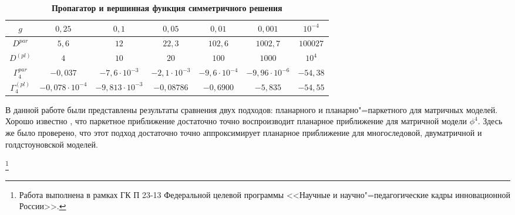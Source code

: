 \begin{table}[h!]
\centering \small
\setlength{\tabcolsep}{4.2pt}
\caption{\bf Пропагатор и вершинная функция симметричного решения \label{sisk:3}} \vspace{-3mm}
\begin{tabular}{c|cccccc}
\hline \scriptsize $g$ & \scriptsize $0,25$ & \scriptsize $0,1$ & \scriptsize$0,05$ & \scriptsize$0,01$ & \scriptsize$0,001$ & $10^{-4}$
\\
\hline 
\rule{0mm}{12pt}%
\scriptsize $D^{par}$ & $5,6$ & $12$ & $22,3$ & $102,6$ & $1002,7$ & $100027$ \\
\scriptsize $D^{(pl)}$ & $4$ & $10$ & $20$ & $100$ & $1000$ & $10^{4}$
\\
\hline 
\rule{0mm}{12pt}%
\scriptsize $\Gamma _4^{par}$ & $-0,037 $ & $-7,6 \cdot 10^{-3}$ & $-2,1\cdot 10^{-3}$ & $-9,6\cdot 10^{-4}$ & $-9,96\cdot 10^{-6}$ & $-54,38$
\\
\scriptsize $\Gamma _4^{(pl)}$ & $-0,078 \cdot 10^{-4}$ & $-9,813 \cdot 10^{-3}$ & $-0,08786$ & $-0,6900$ & $-5,835$ & $-54,55$
\\
\hline
\end{tabular}
\end{table}

 В данной работе были представлены результаты сравнения двух подходов: планарного и планарно"=паркетного для
матричных моделей. Хорошо известно \cite{shish:az}, что паркетное приближение достаточно точно воспроизводит планарное
приближение для матричной модели $\phi^4$. Здесь же было проверено, что этот подход достаточно точно аппроксимирует планарное
приближение для многоследовой, двуматричной и голдстоуновской моделей.

\thanks{Работа выполнена в рамках ГК П 23-13 Федеральной целевой программы
<<Научные и научно"=педагогические кадры инновационной России>>.}


